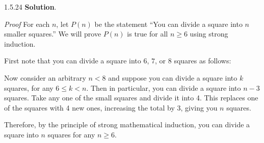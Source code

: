 \documentclass[11pt,]{book}
\makeatletter
\theoremstyle{ptxplainnotitle}
\theoremstyle{ptxplaintitle}
\renewcommand*{\proofname}{Proof}
\renewenvironment{proof}[1][\proofname]{\par
  \pushQED{\qed}%
  \normalfont \topsep6\p@\@plus6\p@\relax
  \trivlist
  \item\relax
    {\itshape
    #1\@addpunct{.}}\hspace\labelsep\ignorespaces
}{%
  \popQED\endtrivlist\@endpefalse
}
\theoremstyle{ptxdefinitionnotitle}
\theoremstyle{ptxdefinitiontitle}
\theoremstyle{ptxdefinitionnotitle}
\theoremstyle{ptxdefinitiontitle}
\theoremstyle{ptxdefinitionnotitle}
\theoremstyle{ptxdefinitiontitle}
\theoremstyle{ptxdefinitiontitlenonumber}
\theoremstyle{ptxdefinitiontitlenonumber}
\numberwithin{equation}{chapter}
\newcommand{\lt}{<}
\makeatother
\begin{document}
\begin{divisionexercise}{1.5.24}
\textbf{Solution}.\quad%
\begin{proof}\hypertarget{proof-19}{}
\hypertarget{p-653}{}%
For each \(n\), let \(P(n)\) be the statement ``You can divide a square into \(n\) smaller squares.''  We will prove \(P(n)\) is true for all \(n \ge 6\) using strong induction.%
\par
\hypertarget{p-654}{}%
First note that you can divide a square into \(6\), \(7\), or \(8\) squares as follows:%
\begin{sidebyside}{3}{0.0166666666666667}{0.0166666666666667}{0.0333333333333333}
\begin{sbspanel}{0.3}
\end{sbspanel}
\begin{sbspanel}{0.3}
\end{sbspanel}
\begin{sbspanel}{0.3}
\end{sbspanel}
\end{sidebyside}
\par
\hypertarget{p-655}{}%
Now consider an arbitrary \(n \lt 8\) and suppose you can divide a square into \(k\) squares, for any \(6 \le k \lt n\).  Then in particular, you can divide a square into \(n-3\) squares.  Take any one of the small squares and divide it into 4.  This replaces one of the squares with 4 new ones, increasing the total by 3, giving you \(n\) squares.%
\par
\hypertarget{p-656}{}%
Therefore, by the principle of strong mathematical induction, you can divide a square into \(n\) squares for any \(n \ge 6\).%
\end{proof}
\end{divisionexercise}%
\end{document}
